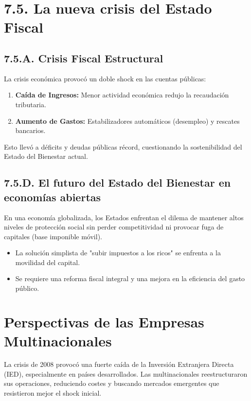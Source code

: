 \documentclass[a4paper,12pt]{report}
\theoremstyle{ejerciciostyle}
\begin{document}
\section{7.5. La nueva crisis del Estado Fiscal}

\subsection{7.5.A. Crisis Fiscal Estructural}
La crisis económica provocó un doble shock en las cuentas públicas:
\begin{enumerate}
    \item \textbf{Caída de Ingresos:} Menor actividad económica redujo la recaudación tributaria.
    \item \textbf{Aumento de Gastos:} Estabilizadores automáticos (desempleo) y rescates bancarios.
\end{enumerate}
Esto llevó a déficits y deudas públicas récord, cuestionando la sostenibilidad del Estado del Bienestar actual.

\subsection{7.5.D. El futuro del Estado del Bienestar en economías abiertas}
En una economía globalizada, los Estados enfrentan el dilema de mantener altos niveles de protección social sin perder competitividad ni provocar fuga de capitales (base imponible móvil).
\begin{itemize}
    \item La solución simplista de "subir impuestos a los ricos" se enfrenta a la movilidad del capital.
    \item Se requiere una reforma fiscal integral y una mejora en la eficiencia del gasto público.
\end{itemize}

\section{Perspectivas de las Empresas Multinacionales}
La crisis de 2008 provocó una fuerte caída de la Inversión Extranjera Directa (IED), especialmente en países desarrollados. Las multinacionales reestructuraron sus operaciones, reduciendo costes y buscando mercados emergentes que resistieron mejor el shock inicial.
\end{document}
